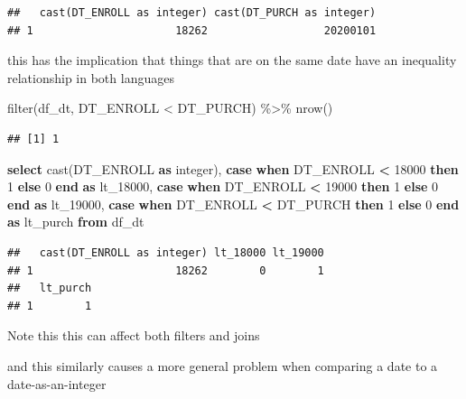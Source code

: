 \documentclass[
]{krantz}
\makeatletter
\newenvironment{Shaded}{\begin{snugshade}}{\end{snugshade}}
\newcommand{\ControlFlowTok}[1]{\textcolor[rgb]{0.27,0.27,0.27}{\textbf{#1}}}
\newcommand{\DataTypeTok}[1]{\textcolor[rgb]{0.27,0.27,0.27}{#1}}
\newcommand{\DecValTok}[1]{\textcolor[rgb]{0.06,0.06,0.06}{#1}}
\newcommand{\FunctionTok}[1]{\textcolor[rgb]{0,0,0}{#1}}
\newcommand{\KeywordTok}[1]{\textcolor[rgb]{0.27,0.27,0.27}{\textbf{#1}}}
\newcommand{\NormalTok}[1]{#1}
\newcommand{\OperatorTok}[1]{\textcolor[rgb]{0.43,0.43,0.43}{\textbf{#1}}}
\newcommand{\SpecialCharTok}[1]{\textcolor[rgb]{0,0,0}{#1}}
\newenvironment{kframe}{%
\medskip{}
\setlength{\fboxsep}{.8em}
 \def\at@end@of@kframe{}%
 \ifinner\ifhmode%
  \def\at@end@of@kframe{\end{minipage}}%
  \begin{minipage}{\columnwidth}%
 \fi\fi%
 \def\FrameCommand##1{\hskip\@totalleftmargin \hskip-\fboxsep
 \colorbox{shadecolor}{##1}\hskip-\fboxsep
     \hskip-\linewidth \hskip-\@totalleftmargin \hskip\columnwidth}%
 \MakeFramed {\advance\hsize-\width
   \@totalleftmargin\z@ \linewidth\hsize
   \@setminipage}}%
 {\par\unskip\endMakeFramed%
 \at@end@of@kframe}
\renewenvironment{Shaded}{\begin{kframe}}{\end{kframe}}
\makeatother
\begin{document}
\begin{verbatim}
##   cast(DT_ENROLL as integer) cast(DT_PURCH as integer)
## 1                      18262                  20200101
\end{verbatim}

this has the implication that things that are on the same date have an inequality relationship in both languages

\begin{Shaded}
\begin{Highlighting}[]
\FunctionTok{filter}\NormalTok{(df\_dt, DT\_ENROLL }\SpecialCharTok{\textless{}}\NormalTok{ DT\_PURCH) }\SpecialCharTok{\%\textgreater{}\%} \FunctionTok{nrow}\NormalTok{()}
\end{Highlighting}
\end{Shaded}

\begin{verbatim}
## [1] 1
\end{verbatim}

\begin{Shaded}
\begin{Highlighting}[]
\KeywordTok{select} 
  \FunctionTok{cast}\NormalTok{(DT\_ENROLL }\KeywordTok{as} \DataTypeTok{integer}\NormalTok{), }
  \ControlFlowTok{case} \ControlFlowTok{when}\NormalTok{ DT\_ENROLL }\OperatorTok{\textless{}} \DecValTok{18000} \ControlFlowTok{then} \DecValTok{1} \ControlFlowTok{else} \DecValTok{0} \ControlFlowTok{end} \KeywordTok{as}\NormalTok{ lt\_18000,}
  \ControlFlowTok{case} \ControlFlowTok{when}\NormalTok{ DT\_ENROLL }\OperatorTok{\textless{}} \DecValTok{19000} \ControlFlowTok{then} \DecValTok{1} \ControlFlowTok{else} \DecValTok{0} \ControlFlowTok{end} \KeywordTok{as}\NormalTok{ lt\_19000,}
  \ControlFlowTok{case} \ControlFlowTok{when}\NormalTok{ DT\_ENROLL }\OperatorTok{\textless{}}\NormalTok{ DT\_PURCH }\ControlFlowTok{then} \DecValTok{1} \ControlFlowTok{else} \DecValTok{0} \ControlFlowTok{end} \KeywordTok{as}\NormalTok{ lt\_purch}
\KeywordTok{from}\NormalTok{ df\_dt}
\end{Highlighting}
\end{Shaded}

\begin{verbatim}
##   cast(DT_ENROLL as integer) lt_18000 lt_19000
## 1                      18262        0        1
##   lt_purch
## 1        1
\end{verbatim}

Note this this can affect both filters and joins

and this similarly causes a more general problem when comparing a date to a date-as-an-integer
\end{document}
